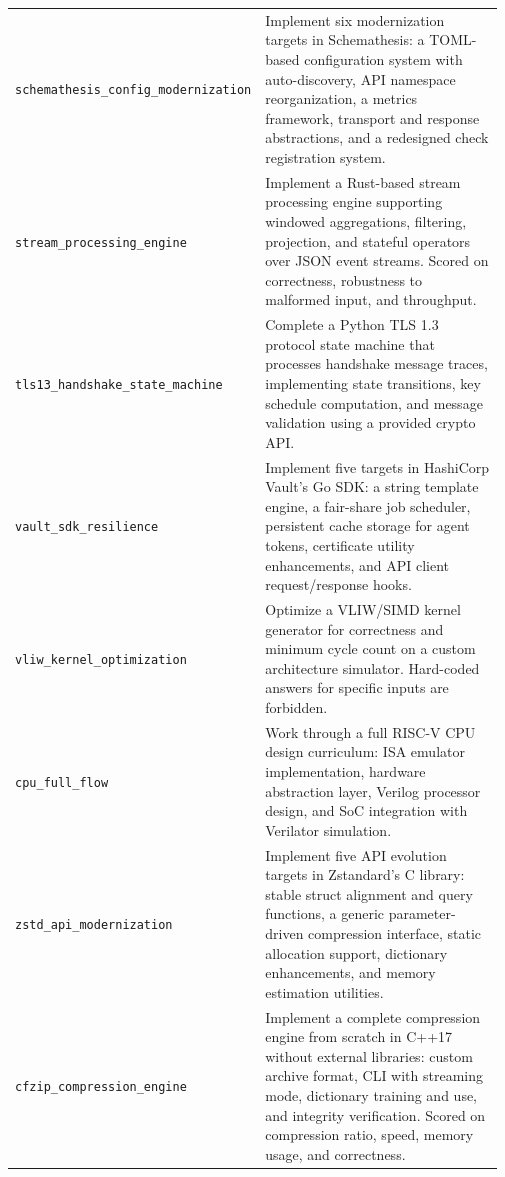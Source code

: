 \begin{longtable}{@{}>{\raggedright\arraybackslash}p{0.20\linewidth}>{\raggedright\arraybackslash}p{0.77\linewidth}@{}}
\tasknoterule
\texttt{schemathesis\_\allowbreak{}config\_\allowbreak{}modernization} & Implement six modernization targets in Schemathesis: a TOML-based configuration system with auto-discovery, API namespace reorganization, a metrics framework, transport and response abstractions, and a redesigned check registration system. \\
\tasknoterule
\texttt{stream\_\allowbreak{}processing\_\allowbreak{}engine} & Implement a Rust-based stream processing engine supporting windowed aggregations, filtering, projection, and stateful operators over JSON event streams. Scored on correctness, robustness to malformed input, and throughput. \\
\tasknoterule
\texttt{tls13\_\allowbreak{}handshake\_\allowbreak{}state\_\allowbreak{}machine} & Complete a Python TLS 1.3 protocol state machine that processes handshake message traces, implementing state transitions, key schedule computation, and message validation using a provided crypto API. \\
\tasknoterule
\texttt{vault\_\allowbreak{}sdk\_\allowbreak{}resilience} & Implement five targets in HashiCorp Vault's Go SDK: a string template engine, a fair-share job scheduler, persistent cache storage for agent tokens, certificate utility enhancements, and API client request/response hooks. \\
\tasknoterule
\texttt{vliw\_\allowbreak{}kernel\_\allowbreak{}optimization} & Optimize a VLIW/SIMD kernel generator for correctness and minimum cycle count on a custom architecture simulator. Hard-coded answers for specific inputs are forbidden. \\
\tasknoterule
\texttt{cpu\_\allowbreak{}full\_\allowbreak{}flow} & Work through a full RISC-V CPU design curriculum: ISA emulator implementation, hardware abstraction layer, Verilog processor design, and SoC integration with Verilator simulation. \\
\tasknoterule
\texttt{zstd\_\allowbreak{}api\_\allowbreak{}modernization} & Implement five API evolution targets in Zstandard's C library: stable struct alignment and query functions, a generic parameter-driven compression interface, static allocation support, dictionary enhancements, and memory estimation utilities. \\
\tasknoterule
\texttt{cfzip\_\allowbreak{}compression\_\allowbreak{}engine} & Implement a complete compression engine from scratch in C++17 without external libraries: custom archive format, CLI with streaming mode, dictionary training and use, and integrity verification. Scored on compression ratio, speed, memory usage, and correctness. \\

\end{longtable}
